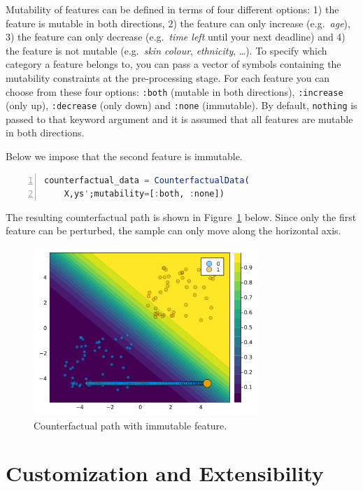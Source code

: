 \documentclass[
  letterpaper,
  DIV=11,
  numbers=noendperiod]{scrartcl}
\begin{document}
Mutability of features can be defined in terms of four different
options: 1) the feature is mutable in both directions, 2) the feature
can only increase (e.g.~\emph{age}), 3) the feature can only decrease
(e.g.~\emph{time left} until your next deadline) and 4) the feature is
not mutable (e.g.~\emph{skin colour}, \emph{ethnicity}, \ldots). To
specify which category a feature belongs to, you can pass a vector of
symbols containing the mutability constraints at the pre-processing
stage. For each feature you can choose from these four options:
\texttt{:both} (mutable in both directions), \texttt{:increase} (only
up), \texttt{:decrease} (only down) and \texttt{:none} (immutable). By
default, \texttt{nothing} is passed to that keyword argument and it is
assumed that all features are mutable in both directions.

Below we impose that the second feature is immutable.

\begin{lstlisting}[language=Julia, escapechar=@, numbers=left, label={lst:mutability}, caption={}]
counterfactual_data = CounterfactualData(
    X,ys';mutability=[:both, :none])
\end{lstlisting}

The resulting counterfactual path is shown in
Figure~\ref{fig-mutability} below. Since only the first feature can be
perturbed, the sample can only move along the horizontal axis.

\begin{figure}

{\centering \includegraphics[width=3.33333in,height=2.5in]{www/constraint_mutability.png}

}

\caption{\label{fig-mutability}Counterfactual path with immutable
feature.}

\end{figure}

\hypertarget{sec-custom}{%
\section{Customization and Extensibility}\label{sec-custom}}
\end{document}
